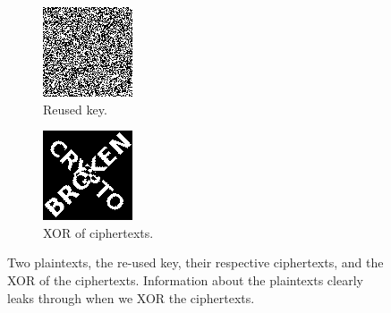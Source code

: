 \documentclass[11pt,ebook,table,dvipsnames]{memoir}
\begin{document}
\begin{figure}[p]
  \begin{subfigure}[b]{.4\textwidth}
    \includegraphics[width=\textwidth]{./Illustrations/KeyReuse/Key.png}
    \caption{Reused key.}
  \end{subfigure}
  \begin{subfigure}[b]{.4\textwidth}
    \includegraphics[width=\textwidth]{./Illustrations/KeyReuse/CiphertextsXOR.png}
    \caption{XOR of ciphertexts.}
  \end{subfigure}

  \caption{Two plaintexts, the re-used key, their respective
    ciphertexts, and the XOR of the ciphertexts. Information about the
    plaintexts clearly leaks through when we XOR the ciphertexts.}
  \label{fig:multitimepad}
\end{figure}
\end{document}
